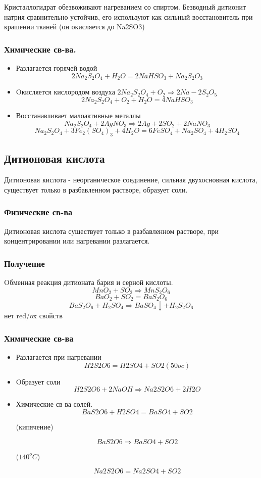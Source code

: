 \documentclass[11pt]{article}
\begin{document}
Кристаллогидрат обезвоживают нагреванием со спиртом. Безводный дитионит натрия
сравнительно устойчив, его используют как сильный восстановитель при крашении тканей
(он окисляется до Na2SO3)

\subsubsection{Химические св-ва.}
\begin{itemize}

\item Разлагается горячей водой
$$2Na_2S_2O_4 + H_2O = 2NaHSO_3 + Na_2S_2O_3$$

\item Oкисляется кислородом воздуха
$2Na_2S_2O_4 + O_2 \Rightarrow 2Na-2S_2O_5$
$$2Na_2S_2O_4 + O_2 + H_2O = 4NaHSO_3$$

\item Восстанавливает малоактивные металлы
$$Na_2S_2O_4 + 2AgNO_3 \Rightarrow 2Ag + 2SO_2 + 2NaNO_3$$
$$Na_2S_2O_4+ 3Fe_2(SO_4)_3 + 4H_2O = 6FeSO_4 + Na_2SO_4 + 4H_2SO_4$$

\end{itemize}


\subsection{Дитионовая кислота}
Дитионовая кислота - неорганическое соединение, сильная двухосновная кислота,
существует только в разбавленном растворе, образует соли.
\subsubsection{Физические св-ва}
Дитионовая кислота существует только в разбавленном растворе, при концентрировании
или нагревании разлагается.
\subsubsection{Получение}
Oбменная реакция дитионата бария и серной кислоты.
$$MnO_2 + SO_2 \Rightarrow MnS_2O_6$$
$$BaO_2 + SO_2 = BaS_2O_6$$
$$BaS_2O_6 + H_2SO_4 \Rightarrow BaSO_4 \downarrow + H_2S_2O_6$$ нет red/ox свойств

\subsubsection{Химические св-ва}
\begin{itemize}
\item Разлагается при нагревании
$$H2S2O6 = H2SO4 + SO2 (50oc)$$
\item  Oбразует соли
$$H2S2O6 + 2NaOH \Rightarrow Na2S2O6 + 2H2O$$
\item Химические св-ва солей.
 $$BaS2O6 + H2SO4 = BaSO4 + SO2$$ \begin{center}(кипячение)\end{center}
$$BaS2O6 \Rightarrow BaSO4 + SO2$$ \begin{center}($140^oC$)\end{center}
$$Na2S2O6 = Na2SO4 + SO2$$
\end{itemize}
\end{document}
